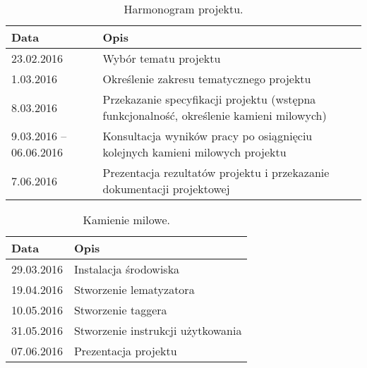 \begin{table}[H]
	\centering
	\caption{Harmonogram projektu.}
	\smallskip
	\begin{tabular}{p{4cm}p{8cm}}
		\toprule
		\textbf{Data}& \textbf{Opis} \\
		\midrule
		23.02.2016 & Wybór tematu projektu \\
		1.03.2016 & Określenie zakresu tematycznego projektu \\
		8.03.2016 & Przekazanie specyfikacji projektu (wstępna funkcjonalność, określenie kamieni milowych) \\
		9.03.2016 -- 06.06.2016 & Konsultacja wyników pracy po osiągnięciu kolejnych kamieni milowych projektu \\
		7.06.2016 & Prezentacja rezultatów projektu i przekazanie dokumentacji projektowej \\
		\bottomrule
	\end{tabular}
\end{table}

	\begin{table}[H]
	\centering
	\caption{Kamienie milowe.}
	\smallskip
	\begin{tabular}{p{4cm}p{8cm}}
		\toprule
		\textbf{Data}& \textbf{Opis} \\
		\midrule
		29.03.2016 & Instalacja środowiska \\
		19.04.2016 & Stworzenie lematyzatora \\
		10.05.2016 & Stworzenie taggera \\
		31.05.2016 & Stworzenie instrukcji użytkowania \\
		07.06.2016 & Prezentacja projektu \\
		\bottomrule
	\end{tabular}
\end{table}
